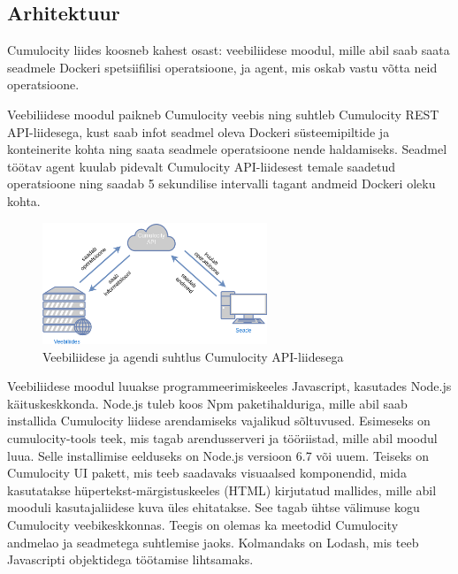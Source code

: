 \documentclass[12pt]{article}
\begin{document}
 
  \subsection{Arhitektuur}
  Cumulocity liides koosneb kahest osast: veebiliidese moodul, mille abil saab saata seadmele
  Dockeri spetsiifilisi operatsioone, ja agent, mis oskab vastu võtta neid operatsioone.
 
  Veebiliidese moodul paikneb Cumulocity veebis ning suhtleb Cumulocity REST API-liidesega, kust
  saab infot seadmel oleva Dockeri süsteemipiltide ja konteinerite kohta ning saata
  seadmele operatsioone nende haldamiseks. Seadmel töötav agent kuulab pidevalt Cumulocity
  API-liidesest temale saadetud operatsioone ning saadab 5 sekundilise intervalli tagant
  andmeid Dockeri oleku kohta.
 
  \begin{figure} [ht] %
  \begin{center}
  \includegraphics[width=0.6\textwidth]{architecture}
  \caption{Veebiliidese ja agendi suhtlus Cumulocity API-liidesega}
  \label{fig:architecture}
  \end{center}
  \end{figure}
 
  \FloatBarrier
 
  Veebiliidese moodul luuakse
  programmeerimiskeeles Javascript, kasutades Node.js käituskeskkonda. Node.js tuleb koos
  Npm paketihalduriga, mille abil saab installida Cumulocity liidese arendamiseks vajalikud
  sõltuvused. Esimeseks on cumulocity-tools teek, mis tagab arendusserveri ja tööriistad, mille
  abil moodul luua. Selle installimise eelduseks on Node.js versioon 6.7 või uuem.
  Teiseks on Cumulocity UI pakett, mis teeb saadavaks visuaalsed komponendid, mida
  kasutatakse hüpertekst-märgistuskeeles (HTML)
  kirjutatud mallides, mille abil mooduli kasutajaliidese kuva üles ehitatakse.
  See tagab ühtse välimuse kogu Cumulocity veebikeskkonnas.
  Teegis on olemas ka meetodid Cumulocity andmelao ja seadmetega suhtlemise jaoks.
  Kolmandaks on Lodash, mis teeb Javascripti objektidega töötamise lihtsamaks.
 
\end{document}
